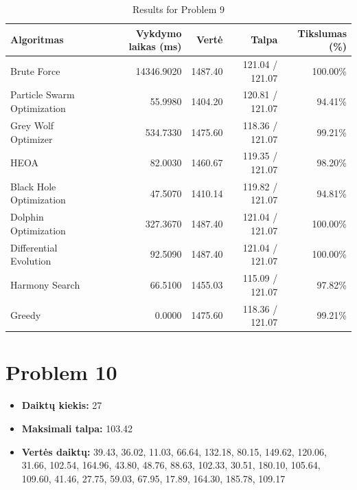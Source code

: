 \documentclass[a4paper,11pt]{article}
\begin{document}
\begin{table}[h!]
\centering
\begin{tabular}{lrrrr}
\toprule
\textbf{Algoritmas} & \textbf{Vykdymo laikas (ms)} & \textbf{Vertė} & \textbf{Talpa} & \textbf{Tikslumas (\%)} \\
\midrule
Brute Force & 14346.9020 & 1487.40 & 121.04 / 121.07 & 100.00\% \\
Particle Swarm Optimization & 55.9980 & 1404.20 & 120.81 / 121.07 & 94.41\% \\
Grey Wolf Optimizer & 534.7330 & 1475.60 & 118.36 / 121.07 & 99.21\% \\
HEOA & 82.0030 & 1460.67 & 119.35 / 121.07 & 98.20\% \\
Black Hole Optimization & 47.5070 & 1410.14 & 119.82 / 121.07 & 94.81\% \\
Dolphin Optimization & 327.3670 & 1487.40 & 121.04 / 121.07 & 100.00\% \\
Differential Evolution & 92.5090 & 1487.40 & 121.04 / 121.07 & 100.00\% \\
Harmony Search & 66.5100 & 1455.03 & 115.09 / 121.07 & 97.82\% \\
Greedy & 0.0000 & 1475.60 & 118.36 / 121.07 & 99.21\% \\
\bottomrule
\end{tabular}
\caption{Results for Problem 9}
\end{table}
\clearpage

\section*{Problem 10}
\begin{itemize}
    \item \textbf{Daiktų kiekis:} 27
    \item \textbf{Maksimali talpa:} 103.42
    \item \textbf{Vertės daiktų:} 39.43, 36.02, 11.03, 66.64, 132.18, 80.15, 149.62, 120.06, 31.66, 102.54, 164.96, 43.80, 48.76, 88.63, 102.33, 30.51, 180.10, 105.64, 109.60, 41.46, 27.75, 59.03, 67.95, 17.89, 164.30, 185.78, 109.17
\end{itemize}
\end{document}
